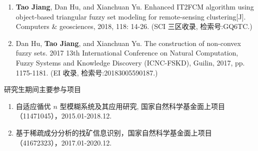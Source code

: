 \begin{paper}
\begin{enumerate}
  \item \textbf{Tao Jiang}, Dan Hu, and Xianchuan Yu.  Enhanced IT2FCM algorithm using object-based triangular fuzzy set modeling for remote-sensing clustering[J]. Computers \& geosciences, 2018, 118: 14-26. (SCI 三区收录, 检索号:GQ6TC.)
  \item Dan Hu, \textbf{Tao Jiang}, and Xianchuan Yu. The construction of non-convex fuzzy sets. 2017 13th International Conference on Natural Computation, Fuzzy Systems and Knowledge  Discovery (ICNC-FSKD), Guilin, 2017, pp. 1175-1181. (EI 收录, 检索号:20183005590187.)\\
  \end{enumerate}

\end{paper}





\begin{center}
  \large 研究生期间主要参与项目
\end{center}

\begin{enumerate}[(1)]
\item 自适应循优 $n$ 型模糊系统及其应用研究, 国家自然科学基金面上项目（11471045），2015.01-2018.12.

\item 基于稀疏成分分析的找矿信息识别，国家自然科学基金面上项目（41672323），2017.01-2020.12.\\

\end{enumerate}

